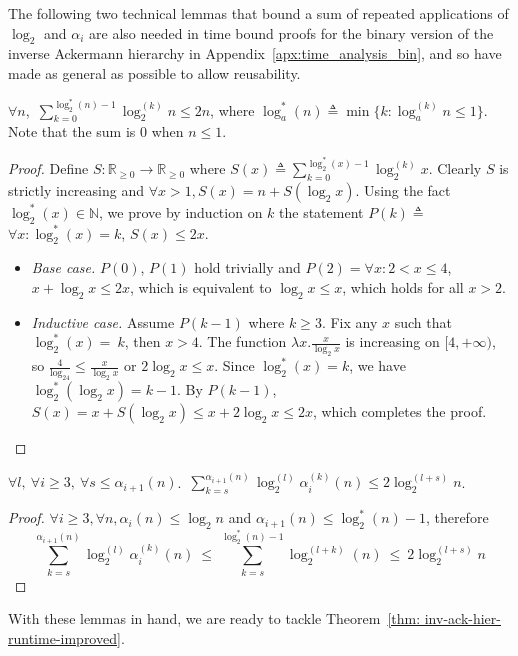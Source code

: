 \noindent The following two technical lemmas that bound a sum of repeated applications of $\log_2$ and $\alpha_i$ are also needed in time bound proofs for the binary version of the inverse Ackermann hierarchy in Appendix~\ref{apx:time_analysis_bin}, and so have made as general as possible to allow reusability.

\begin{lem} \label{lem: sum-log-repeat}
	$\forall n$,~$\displaystyle \sum_{k = 0}^{\log_2^*(n) - 1}\log_2^{(k)}n \le 2n$, where $\log_a^*(n) \triangleq \min\{k : \log_a^{(k)}n \le 1\}$. Note that the sum is $0$ when $n\le 1$.
\end{lem}

\begin{proof}
	Define $S: \mathbb{R}_{\ge 0}\to \mathbb{R}_{\ge 0}$ where $S(x) \triangleq \sum_{k = 0}^{\log_2^*(x) - 1}\log_2^{(k)}x$. Clearly $S$ is strictly increasing and $\forall x>1, S(x) = n + S(\log_2 x)$. Using the fact $\log_2^*(x)\in \mathbb{N}$, we prove by induction on $k$ the statement $P(k) \triangleq$ $\forall x: \log_2^*(x) = k$, $S(x)\le 2x$.
	\begin{itemize}[leftmargin=*]
		\item \emph{Base case.} $P(0)$, $P(1)$ hold trivially and $P(2) = \forall x: 2 < x \le 4$, $x + \log_2x \le 2x$, which is equivalent to $\log_2x \le x$, which holds for all $x > 2$.
		\item \emph{Inductive case.} Assume $P(k-1)$ where $k\ge 3$. Fix any $x$ such that $\log_2^*(x)=~k$, then $x > 4$. The function $\lambda x.\frac{x}{\log_2x}$ is increasing on $[4, +\infty)$, so $\frac{4}{\log_24} \le \frac{x}{\log_2x}$ or $2\log_2x \le x$. Since $\log_2^*(x) = k$, we have $\log_2^*(\log_2x) = k-1$. By $P(k-1)$, $S(x) = x + S(\log_2x) \le x + 2\log_2x \le 2x$, which completes the proof.
	\end{itemize}
\end{proof}

\begin{lem} \label{lem: sum-alpha-repeat}
	$\forall l,~\forall i \ge 3,~\forall s\le \alpha_{i+1}(n)$.~$\displaystyle \sum_{k=s}^{\alpha_{i+1}(n)} \log_2^{(l)}\alpha_i^{(k)}(n) \le 2\log_2^{(l+s)}n$.
\end{lem}

\begin{proof}
  $\forall i\ge 3, \forall n, \alpha_i(n)\le \log_2n$ and $\alpha_{i+1}(n)\le \log_2^*(n)-1$, therefore
	\begin{equation*}
	\sum_{k=s}^{\alpha_{i+1}(n)} \log_2^{(l)}\alpha_i^{(k)}(n) \ \le \
	\sum_{k=s}^{\log_2^*(n)-1} \log_2^{(l+k)}(n) \ \le \
	2\log_2^{(l+s)} n
	\end{equation*}
\end{proof}
With these lemmas in hand, we are ready to tackle Theorem~\ref{thm: inv-ack-hier-runtime-improved}.

